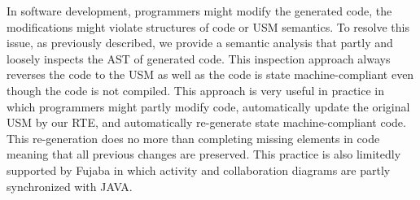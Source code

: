 In software development, programmers might modify the generated code, the modifications might violate structures of code or USM semantics. To resolve this issue, as previously described, we provide a semantic analysis that partly and loosely inspects the AST of generated code. This inspection approach always reverses the code to the USM as well as the code is state machine-compliant even though the code is not compiled. This approach is very useful in practice in which programmers might partly modify code, automatically update the original USM by our RTE, and automatically re-generate state machine-compliant code. This re-generation does no more than completing missing elements in code meaning that all previous changes are preserved. This practice is also limitedly supported by Fujaba \cite{KNNZ99_2_ag} in which activity and collaboration diagrams are partly synchronized with JAVA.